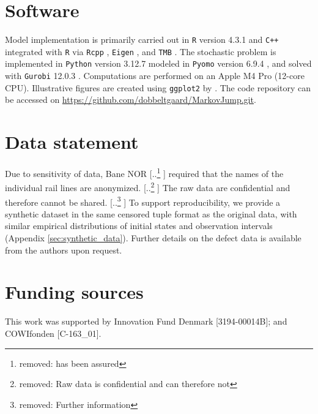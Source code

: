 \documentclass{article}
\providecommand{\DIFadd}[1]{{\protect\color{blue} \sf #1}} %
\providecommand{\DIFdel}[1]{{\protect\color{red} [..\footnote{removed: #1} ]}} %
\providecommand{\DIFaddbegin}{} %
\providecommand{\DIFaddend}{} %
\providecommand{\DIFdelbegin}{} %
\providecommand{\DIFdelend}{} %
\begin{document}
\section*{Software}
Model implementation is \DIFaddbegin \DIFadd{primarily }\DIFaddend carried out in \texttt{R} version 4.3.1 \citep{R_stats} and \texttt{C++} integrated with \texttt{R} via \texttt{Rcpp} \citep{Rcpp}, \texttt{Eigen} \citep{eigenweb}, and \texttt{TMB} \citep{TMB}. 
\DIFaddbegin \DIFadd{The stochastic problem is implemented in \texttt{Python} version 3.12.7 modeled in \texttt{Pyomo} version 6.9.4 \citep{bynum2021pyomo,hart2011pyomo}, and solved with \texttt{Gurobi} 12.0.3 \citep{gurobi}.
}\DIFaddend Computations are performed on an Apple M4 Pro (12-core CPU). Illustrative figures are created using \verb|ggplot2| by \citet{ggplot2}. The code repository can be accessed on \url{https://github.com/dobbeltgaard/MarkovJump.git}.

\section*{Data statement}
Due to sensitivity of data, Bane NOR \DIFdelbegin \DIFdel{has been assured }\DIFdelend \DIFaddbegin \DIFadd{required }\DIFaddend that the names of the individual rail lines are anonymized. \DIFdelbegin \DIFdel{Raw data is confidential and can therefore not }\DIFdelend \DIFaddbegin \DIFadd{The raw data are confidential and therefore cannot }\DIFaddend be shared. \DIFdelbegin \DIFdel{Further information }\DIFdelend \DIFaddbegin \DIFadd{To support reproducibility, we provide a synthetic dataset in the same censored tuple format as the original data, with similar empirical distributions of initial states and observation intervals (Appendix \ref{sec:synthetic_data}). Further details }\DIFaddend on the defect data is available from the authors \DIFaddbegin \DIFadd{upon request}\DIFaddend .


\section*{Funding sources}
This work was supported by Innovation Fund Denmark [3194-00014B]; and COWIfonden [C-163\_01].
\end{document}
